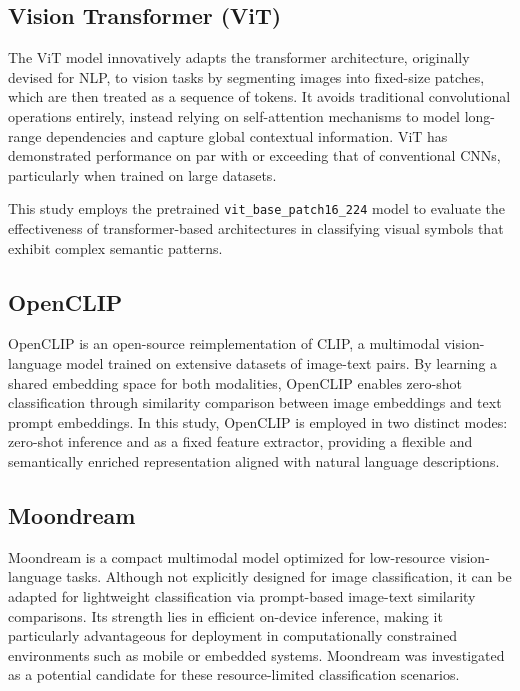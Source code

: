 \subsection{Vision Transformer (ViT)}

The \ac{ViT} model innovatively adapts the transformer architecture, originally devised for \ac{NLP}, to vision
tasks by segmenting images into fixed-size patches, which are then treated as a sequence of tokens. It avoids
traditional convolutional operations entirely, instead relying on self-attention mechanisms to model long-range
dependencies and capture global contextual information. \ac{ViT} has demonstrated performance on par with or
exceeding that of conventional \acp{CNN}, particularly when trained on large datasets.

This study employs the pretrained \texttt{vit\_base\_patch16\_224} model to evaluate the effectiveness of
transformer-based architectures in classifying visual symbols that exhibit complex semantic patterns.

\subsection{OpenCLIP}
OpenCLIP is an open-source reimplementation of \ac{CLIP}, a multimodal vision-language model trained on extensive
datasets of image-text pairs. By learning a shared embedding space for both modalities, OpenCLIP enables zero-shot
classification through similarity comparison between image embeddings and text prompt embeddings. In this study,
OpenCLIP is employed in two distinct modes: zero-shot inference and as a fixed feature extractor, providing a
flexible and semantically enriched representation aligned with natural language descriptions.

\subsection{Moondream}
Moondream is a compact multimodal model optimized for low-resource vision-language tasks. Although not explicitly
designed for image classification, it can be adapted for lightweight classification via prompt-based image-text
similarity comparisons. Its strength lies in efficient on-device inference, making it particularly advantageous for
deployment in computationally constrained environments such as mobile or embedded systems. Moondream was investigated
as a potential candidate for these resource-limited classification scenarios.

